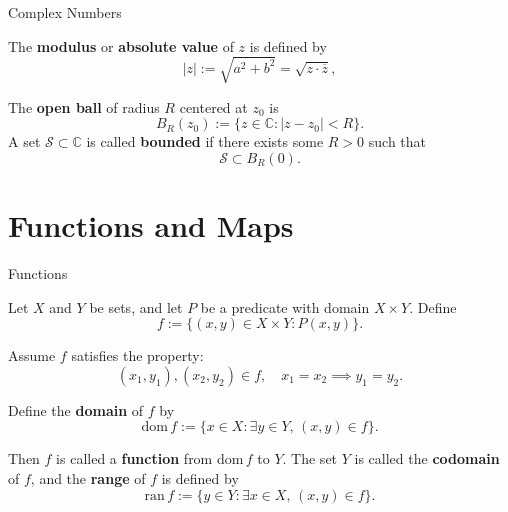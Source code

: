 \documentclass[dvipsnames]{beamer}
\theoremstyle{plain}
\theoremstyle{definition}
\begin{document}
\begin{frame}{Complex Numbers}

\begin{definition}
The \textbf{modulus} or \textbf{absolute value} of \(z\) is defined by
\[
|z| := \sqrt{a^2 + b^2} = \sqrt{z \cdot \overline{z}},
\] 
\end{definition}

\begin{definition}
The \textbf{open ball} of radius \(R\) centered at \(z_0\) is
\[
B_R(z_0) := \{ z \in \mathbb{C} : |z - z_0| < R \}.
\]
A set \(\mathcal{S} \subset \mathbb{C}\) is called \textbf{bounded} if there exists some \(R > 0\) such that
\[
\mathcal{S} \subset B_R(0).
\]
\end{definition}

\end{frame}

\section{Functions and Maps}
\begin{frame}{Functions}

\begin{definition}
Let \(X\) and \(Y\) be sets, and let \(P\) be a predicate with domain \(X \times Y\).  
Define
\[
f := \{ (x, y) \in X \times Y : P(x, y) \}.
\]

Assume \(f\) satisfies the property:
\[
(x_1, y_1), (x_2, y_2) \in f, \quad x_1 = x_2 \implies y_1 = y_2.
\]

Define the \textbf{domain} of \(f\) by
\[
\mathrm{dom}\,f := \{ x \in X : \exists y \in Y,\, (x, y) \in f \}.
\]

Then \(f\) is called a \textbf{function} from \(\mathrm{dom}\,f\) to \(Y\).  
The set \(Y\) is called the \textbf{codomain} of \(f\), and the \textbf{range} of \(f\) is defined by
\[
\mathrm{ran}\,f := \{ y \in Y : \exists x \in X,\, (x, y) \in f \}.
\]
\end{definition}

\end{frame}
\end{document}
